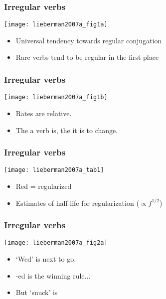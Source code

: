 \begin{frame}
  \frametitle{Irregular verbs}


  \begin{block}{}
    \texttt{[image: lieberman2007a\_fig1a]}

    \begin{itemize}
    \item Universal tendency towards regular conjugation
    \item Rare verbs tend to be regular in the first place
    \end{itemize}
  \end{block}

\end{frame}

\begin{frame}
  \frametitle{Irregular verbs}

  \begin{block}{}
  \texttt{[image: lieberman2007a\_fig1b]}

  \begin{itemize}
  \item<1->
    Rates are relative.
  \item<2->
    The  a verb is, the 
    it is to change.
  \end{itemize}
  \end{block}

\end{frame}

\begin{frame}[plain]
  \frametitle{Irregular verbs}

  \begin{block}{}
    \texttt{[image: lieberman2007a\_tab1]}

    \begin{itemize}
    \item \alert{Red} = regularized
    \item Estimates of half-life for regularization ($\propto f^{1/2}$)
    \end{itemize}
  \end{block}

\end{frame}

\begin{frame}
  \frametitle{Irregular verbs}

  \begin{block}{}
  \texttt{[image: lieberman2007a\_fig2a]}

  \begin{itemize}
  \item 
    `Wed' is next to go.
  \item 
    -ed is the winning rule...
  \item<+->
    But `snuck' is 
    \cite{michel2010a}
  \end{itemize}
  \end{block}

\end{frame}

